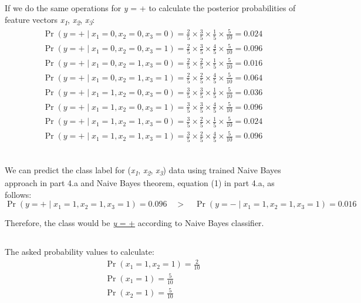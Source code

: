 \documentclass{article}
\DeclareMathOperator{\CondProb}{Pr}
\newcommand{\writex}[2]{{\it{#1\textsubscript#2}}}
\newcommand{\writey}[1]{{\it{#1}}}
\begin{document}
If we do the same operations for  \writey{y} = + to calculate the posterior probabilities of feature vectors \writex{x}{1}, \writex{x}{2}, \writex{x}{3}:
\begin{equation*}
	\begin{aligned}
	\CondProb{(y = +  \mid x_1 = 0, x_2 = 0, x_3 = 0)} = \frac{2}{5}\times\frac{3}{5}\times\frac{1}{5}\times\frac{5}{10} =  0.024 \\
	\CondProb{(y = +  \mid x_1 = 0, x_2 = 0, x_3 = 1)} = \frac{2}{5}\times\frac{3}{5}\times\frac{4}{5}\times\frac{5}{10} =  0.096 \\
	\CondProb{(y = +  \mid x_1 = 0, x_2 = 1, x_3 = 0)} = \frac{2}{5}\times\frac{2}{5}\times\frac{1}{5}\times\frac{5}{10} =  0.016 \\
	\CondProb{(y = +  \mid x_1 = 0, x_2 = 1, x_3 = 1)} = \frac{2}{5}\times\frac{2}{5}\times\frac{4}{5}\times\frac{5}{10} =  0.064 \\
	\CondProb{(y = +  \mid x_1 = 1, x_2 = 0, x_3 = 0)} = \frac{3}{5}\times\frac{3}{5}\times\frac{1}{5}\times\frac{5}{10}  = 0.036 \\
	\CondProb{(y = +  \mid x_1 = 1, x_2 = 0, x_3 = 1)} = \frac{3}{5}\times\frac{3}{5}\times\frac{4}{5}\times\frac{5}{10}  = 0.096 \\
	\CondProb{(y = +  \mid x_1 = 1, x_2 = 1, x_3 = 0)} = \frac{3}{5}\times\frac{2}{5}\times\frac{1}{5}\times\frac{5}{10} =  0.024 \\
	\CondProb{(y = +  \mid x_1 = 1, x_2 = 1, x_3 = 1)} = \frac{3}{5}\times\frac{2}{5}\times\frac{4}{5}\times\frac{5}{10} = 0.096 \\
	\end{aligned}
\end{equation*}

\subsection{}
We can predict the class label for (\writex{x}{1}, \writex{x}{2}, \writex{x}{3}) data using trained Naive Bayes approach in part 4.a and Naive Bayes theorem, equation (1) in part 4.a, as follows:
\begin{equation*}
	\CondProb{(y = +  \mid x_1 = 1, x_2 = 1, x_3 = 1)} = 0.096\quad>\quad\CondProb{(y = -  \mid x_1 = 1, x_2 = 1, x_3 = 1)} = 0.016
\end{equation*}

Therefore, the class would be \underline{\writey{y} = +} according to Naive Bayes classifier.

\subsection{}
The asked probability values to calculate: 
\begin{equation*}
	\begin{aligned}
	\CondProb{(x_1 = 1, x_2 = 1)} = \frac{2}{10}\\
	\CondProb{(x_1 = 1)} = \frac{5}{10}\\ 
	\CondProb{(x_2 = 1)} = \frac{5}{10}
	\end{aligned}
\end{equation*}
\end{document}
